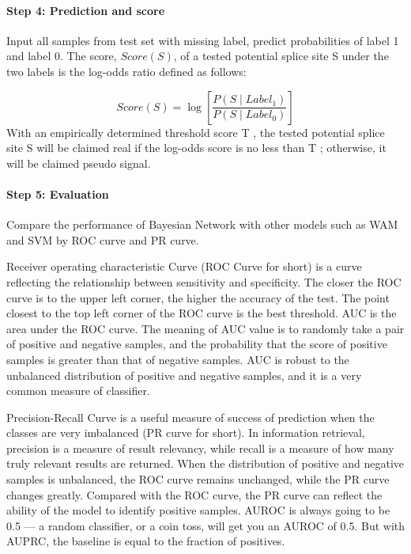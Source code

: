 \documentclass{gapd}
\begin{document}
\paragraph{Step 4: Prediction and score}\label{prediction-and-score}

Input all samples from test set with missing label, predict
probabilities of label 1 and label 0. The score, \(Score(S)\), of a
tested potential splice site S under the two labels is the log-odds
ratio defined as follows:

\[Score(S)=\log \left[\frac{P\left(S \mid Label_{\mathrm{1}}\right)}{P\left(S \mid Label_{\mathrm{0}}\right)}\right]\]
With an empirically determined threshold score T , the tested potential
splice site S will be claimed real if the log-odds score is no less than
T ; otherwise, it will be claimed pseudo signal.

\paragraph{Step 5: Evaluation}\label{evaluation}

Compare the performance of Bayesian Network with other models such as
WAM and SVM by ROC curve and PR curve.

Receiver operating characteristic Curve (ROC Curve for short) is a curve
reflecting the relationship between sensitivity and specificity. The
closer the ROC curve is to the upper left corner, the higher the
accuracy of the test. The point closest to the top left corner of the
ROC curve is the best threshold. AUC is the
area under the ROC curve. The meaning of AUC value is to randomly
take a pair of positive and negative samples, and the probability that
the score of positive samples is greater than that of negative samples.
AUC is robust to the unbalanced distribution of positive and negative
samples, and it is a very common measure of classifier.

Precision-Recall Curve is a useful measure of success of prediction when the
classes are very imbalanced (PR curve for short). In information
retrieval, precision is a measure of result relevancy, while recall is a
measure of how many truly relevant results are returned. When the
distribution of positive and negative samples is unbalanced, the ROC
curve remains unchanged, while the PR curve changes greatly. Compared
with the ROC curve, the PR curve can reflect the ability of the model to
identify positive samples. AUROC is always going to be 0.5 --- a random
classifier, or a coin toss, will get you an AUROC of 0.5. But with
AUPRC, the baseline is equal to the fraction of positives.
\end{document}
